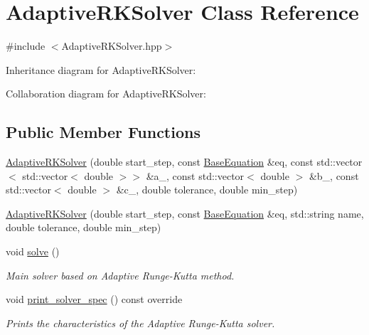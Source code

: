 \hypertarget{classAdaptiveRKSolver}{}\section{Adaptive\+R\+K\+Solver Class Reference}
\label{classAdaptiveRKSolver}


{\ttfamily \#include $<$Adaptive\+R\+K\+Solver.\+hpp$>$}



Inheritance diagram for Adaptive\+R\+K\+Solver\+:


Collaboration diagram for Adaptive\+R\+K\+Solver\+:
\subsection*{Public Member Functions}
\begin{DoxyCompactItemize}
\item 
\hyperlink{classAdaptiveRKSolver_af3fd0e899dbda2be0ff705f8d8ea7a08}{Adaptive\+R\+K\+Solver} (double start\+\_\+step, const \hyperlink{classBaseEquation}{Base\+Equation} \&eq, const std\+::vector$<$ std\+::vector$<$ double $>$$>$ \&a\+\_\+, const std\+::vector$<$ double $>$ \&b\+\_\+, const std\+::vector$<$ double $>$ \&c\+\_\+, double tolerance, double min\+\_\+step)
\item 
\hyperlink{classAdaptiveRKSolver_a6d3aa9cd741ce79167448dfb405f9ff2}{Adaptive\+R\+K\+Solver} (double start\+\_\+step, const \hyperlink{classBaseEquation}{Base\+Equation} \&eq, std\+::string name, double tolerance, double min\+\_\+step)
\item 
void \hyperlink{classAdaptiveRKSolver_ad4178bf295f9101b27ca96a92deb8c3e}{solve} ()
\begin{DoxyCompactList}\small\item\em Main solver based on Adaptive Runge-\/\+Kutta method. \end{DoxyCompactList}\item 
void \hyperlink{classAdaptiveRKSolver_aba981c5c2b0816506bc3a2e1c21d5bc9}{print\+\_\+solver\+\_\+spec} () const override
\begin{DoxyCompactList}\small\item\em Prints the characteristics of the Adaptive Runge-\/\+Kutta solver. \end{DoxyCompactList}\end{DoxyCompactItemize}
